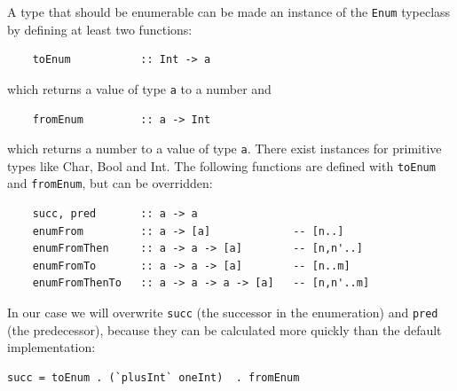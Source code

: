 \documentclass{tmr}
\begin{document}
A type that should be enumerable can be made an instance of the \verb|Enum| typeclass by defining at least two functions:
\begin{Verbatim}
    toEnum           :: Int -> a
\end{Verbatim}
which returns a value of type \verb|a| to a number and
\begin{Verbatim}
    fromEnum         :: a -> Int
\end{Verbatim}
which returns a number to a value of type \verb|a|. There exist instances for primitive types like Char, Bool and Int.
The following functions are defined with \verb|toEnum| and \verb|fromEnum|, but can be overridden:

\begin{Verbatim}
    succ, pred       :: a -> a
    enumFrom         :: a -> [a]             -- [n..]
    enumFromThen     :: a -> a -> [a]        -- [n,n'..]
    enumFromTo       :: a -> a -> [a]        -- [n..m]
    enumFromThenTo   :: a -> a -> a -> [a]   -- [n,n'..m]
\end{Verbatim}

In our case we will overwrite \verb|succ| (the successor in the enumeration) and \verb|pred| (the predecessor), because they can be calculated more quickly than the default implementation:
\begin{Verbatim}
succ = toEnum . (`plusInt` oneInt)  . fromEnum
\end{Verbatim}
\end{document}
